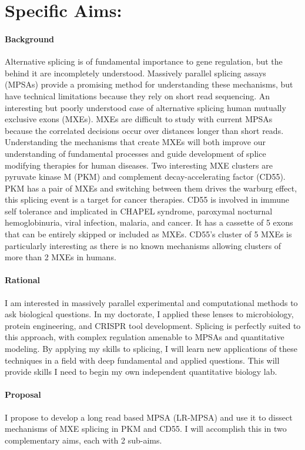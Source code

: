 \documentclass[11pt]{article}
\begin{document}
\section*{Specific Aims:}
\paragraph{Background}
Alternative splicing is of fundamental importance to gene regulation, but the behind it are incompletely understood.
Massively parallel splicing assays (MPSAs) provide a promising method for understanding these mechanisms, but have technical limitations because they rely on short read sequencing.
An interesting but poorly understood case of alternative splicing human mutually exclusive exons (MXEs).
MXEs are difficult to study with current MPSAs because the correlated decisions occur over distances longer than short reads.
Understanding the mechanisms that create MXEs will both improve our understanding of fundamental processes and guide development of splice modifying therapies for human diseases.
Two interesting MXE clusters are pyruvate kinase M (PKM) and complement decay-accelerating factor (CD55).
PKM has a pair of MXEs and switching between them drives the warburg effect, this splicing event is a target for cancer therapies.
CD55 is involved in immune self tolerance and implicated in CHAPEL syndrome, paroxymal nocturnal hemoglobinuria, viral infection, malaria, and cancer. 
It has a cassette of 5 exons that can be entirely skipped or included as MXEs.
CD55's cluster of 5 MXEs is particularly interesting as there is no known mechanisms allowing clusters of more than 2 MXEs in humans.
%
\paragraph{Rational}
I am interested in massively parallel experimental and computational methods to ask biological questions.
In my doctorate, I applied these lenses to microbiology, protein engineering, and CRISPR tool development.
Splicing is perfectly suited to this approach, with complex regulation amenable to MPSAs and quantitative modeling.
By applying my skills to splicing, I will learn new applications of these techniques in a field with deep fundamental and applied questions.
This will provide skills I need to begin my own independent quantitative biology lab.
%
\paragraph{Proposal}
I propose to develop a long read based MPSA (LR-MPSA) and use it to dissect mechanisms of MXE splicing in PKM and CD55.
I will accomplish this in two complementary aims, each with 2 sub-aims.
\end{document}
